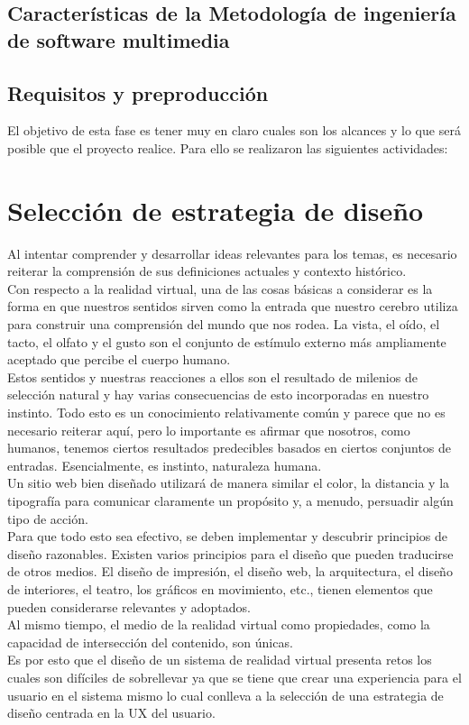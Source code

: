   \subsection{Características de la Metodología de ingeniería de software multimedia}
  \subsection{Requisitos y preproducción}
  El objetivo de esta fase es tener muy en claro cuales son los alcances y lo que será posible que el proyecto realice. Para ello se  realizaron las siguientes actividades:\\

\section{Selección de estrategia de diseño}
Al intentar comprender y desarrollar ideas relevantes para los temas, es necesario reiterar la comprensión de sus definiciones actuales y contexto histórico.\\
Con respecto a la realidad virtual, una de las cosas básicas a considerar es la forma en que nuestros sentidos sirven como la entrada que nuestro cerebro utiliza 
para construir una comprensión del mundo que nos rodea. La vista, el oído, el tacto, el olfato y el gusto son el conjunto de estímulo externo más ampliamente aceptado 
que percibe el cuerpo humano.\\
Estos sentidos y nuestras reacciones a ellos son el resultado de milenios de selección natural y hay varias consecuencias de esto incorporadas en nuestro instinto. 
Todo esto es un conocimiento relativamente común y parece que no es necesario reiterar aquí, pero lo importante es afirmar que nosotros, como humanos, tenemos ciertos 
resultados predecibles basados en ciertos conjuntos de entradas. Esencialmente, es instinto, naturaleza humana.\\
Un sitio web bien diseñado utilizará de manera similar el color, la distancia y la tipografía para comunicar claramente un propósito y, a menudo, persuadir algún tipo de acción.\\
Para que todo esto sea efectivo, se deben implementar y descubrir principios de diseño razonables. Existen varios principios para el diseño que pueden traducirse de otros medios. 
El diseño de impresión, el diseño web, la arquitectura, el diseño de interiores, el teatro, los gráficos en movimiento, etc., tienen elementos que pueden considerarse 
relevantes y adoptados. \cite{web18} \\
Al mismo tiempo, el medio de la realidad virtual como propiedades, como la capacidad de intersección del contenido, son únicas.\\
Es por esto que el diseño de un sistema de realidad virtual presenta retos los cuales son difíciles de sobrellevar ya que se tiene que crear una experiencia para el 
usuario en el sistema mismo lo cual conlleva a la selección de una estrategia de diseño centrada en la UX del usuario.


